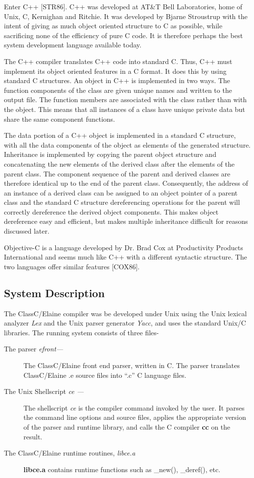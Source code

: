 Enter C++ [STR86].
C++ was developed at AT\&T Bell Laboratories, home of Unix, C, Kernighan and
Ritchie.  It was developed by Bjarne Stroustrup with the intent of giving as
much object oriented structure to C as possible, while sacrificing none of
the efficiency of pure C code.  It is therefore perhaps the best system
development language available today.

The C++ compiler translates C++ code into standard C.  Thus, C++ must implement
its object oriented features in a C format.  It does this by using
standard C structures.  An object in C++ is implemented in two ways.
The function components of the class are given unique names and written
to the output file.  The function members are associated with the class
rather than with the object.  This means that all instances of a class
have unique private data but share the same component functions.

The data portion of a C++ object is implemented in a standard C
structure, with all the data components of the object as elements of
the generated structure.  Inheritance is implemented by
copying the parent object structure and concatenating
the new elements of the derived class after the elements of the parent
class.  The component sequence of the parent and derived classes are therefore
identical up to the end of the parent class.  Consequently, the address
of an instance of a derived class can be assigned to an object pointer
of a parent class and the standard C structure dereferencing operations
for the parent will correctly dereference the derived object
components.
This makes object dereference easy and efficient, but makes multiple
inheritance difficult for reasons discussed later.


Objective-C is a language developed by Dr. Brad Cox at Productivity
Products International and seems much like
C++ with a different syntactic structure.
The two languages offer similar features [COX86].

\subsection{System Description}

The ClassC/Elaine compiler was be developed under Unix using the Unix
lexical analyzer
{\em Lex} and the Unix parser generator {\em Yacc},
and uses the standard Unix/C libraries.  The running system consists
of three files-
\begin{description}
\item [The parser {\em efront---}]
The ClassC/Elaine front end parser, written in C.  The parser translates
ClassC/Elaine .e source files into ``.c'' C language files.
\item[ The Unix Shellscript {\em ce ---}]
The shellscript {\em ce}
is the compiler command invoked by the user.  It parses the command line
options and source files, applies the appropriate version of the parser
and runtime library, and calls the C compiler
{\bf cc} on the result.
\item[The ClassC/Elaine runtime routines, {\em libce.a}]
{\bf libce.a} contains runtime functions such as \_new(), \_deref(), etc.
\end{description}

